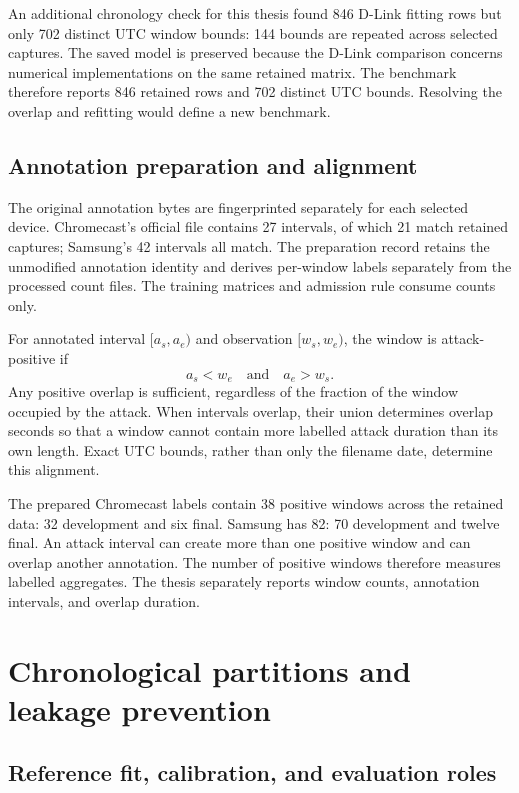 An additional chronology check for this thesis found 846 D-Link fitting
rows but only 702 distinct UTC window bounds: 144 bounds are repeated
across selected captures. The saved model is preserved because the
D-Link comparison concerns numerical implementations on the same retained
matrix. The benchmark therefore reports 846 retained rows and 702 distinct
UTC bounds. Resolving the overlap and refitting would define a new benchmark.

\subsection{Annotation preparation and alignment}

The original annotation bytes are fingerprinted separately for each
selected device. Chromecast's official file contains 27 intervals, of
which 21 match retained captures; Samsung's 42 intervals all match.
The preparation record retains the unmodified annotation identity and
derives per-window labels separately from the processed count files. The
training matrices and admission rule consume counts only.

For annotated interval $[a_s,a_e)$ and observation $[w_s,w_e)$, the
window is attack-positive if
\begin{equation}
 a_s<w_e\quad\text{and}\quad a_e>w_s.
\label{eq:label-overlap}
\end{equation}
Any positive overlap is sufficient, regardless of the fraction of the
window occupied by the attack. When intervals overlap, their union
determines overlap seconds so that a window cannot contain more labelled
attack duration than its own length. Exact UTC bounds, rather than only
the filename date, determine this alignment.

The prepared Chromecast labels contain 38 positive windows across the
retained data: 32 development and six final. Samsung has 82: 70 development
and twelve final. An attack interval can create more than one positive
window and can overlap another annotation. The number of positive windows
therefore measures labelled aggregates. The thesis separately reports
window counts, annotation intervals, and overlap duration.

\section{Chronological partitions and leakage prevention}
\label{sec:experimental-chronology}

\subsection{Reference fit, calibration, and evaluation roles}


